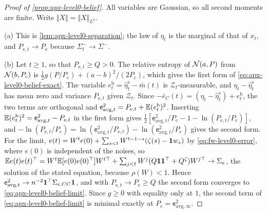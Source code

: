 \begin{proof}[Proof of \cref{prop:apx-level0-belief}]
All variables are Gaussian, so all second moments are finite. Write $\Vert X\Vert=\Vert X\Vert_{L^2}$.

(a) This is \cref{lem:apx-level0-separation}; the law of $\eta_t$ is the marginal of that of $x_t$, and $P_{\mathrm e,t}\to P_{\mathrm e}$ because $\Sigma^-_t\to\Sigma^-$.

(b) Let $t\ge1$, so that $P_{\mathrm e,t}\ge Q>0$. The relative entropy of $\mathcal{N}(a,P)$ from $\mathcal{N}(b,P_{\mathrm c})$ is $\frac12g(P/P_{\mathrm c})+(a-b)^2/(2P_{\mathrm c})$, which gives the first form of \eqref{eq:apx-level0-belief-exact}. The variable $e^{\mathrm b}_t=\hat\eta^{\mathrm e}_t-\bar m(t)$ is $\mathcal Z_t$-measurable, and $\eta_t-\hat\eta^{\mathrm e}_t$ has mean zero and variance $P_{\mathrm e,t}$ given $\mathcal Z_t$. Since $-\bar e_C(t)=(\eta_t-\hat\eta^{\mathrm e}_t)+e^{\mathrm b}_t$, the two terms are orthogonal and $\mathsf e_{\mathrm{avg},t}^2=P_{\mathrm e,t}+\mathbb{E}(e^{\mathrm b}_t)^2$. Inserting $\mathbb{E}(e^{\mathrm b}_t)^2=\mathsf e_{\mathrm{avg},t}^2-P_{\mathrm e,t}$ in the first form gives $\frac12[\mathsf e_{\mathrm{avg},t}^2/P_{\mathrm c}-1-\ln(P_{\mathrm e,t}/P_{\mathrm c})]$, and $-\ln(P_{\mathrm e,t}/P_{\mathrm c})=\ln(\mathsf e_{\mathrm{avg},t}^2/P_{\mathrm e,t})-\ln(\mathsf e_{\mathrm{avg},t}^2/P_{\mathrm c})$ gives the second form. For the limit, $e(t)=W^te(0)+\sum_{s<t}W^{t-1-s}(\zeta(s)-\mathbf{1} w_s)$ by \eqref{eq:fw-level0-error}, where $e(0)$ is independent of the noises, so $\mathbb{E} e(t)e(t)^\top=W^t\mathbb{E}[e(0)e(0)^\top]W^{t\top}+\sum_{j<t}W^j(Q\mathbf{1}\mathbf{1}^\top+Q^\zeta)W^{j\top}\to\Sigma_e$, the solution of the stated equation, because $\rho(W)<1$. Hence $\mathsf e_{\mathrm{avg},t}^2\to n^{-2}\mathbf{1}^\top\Sigma_{e,CC}\mathbf{1}$, and with $P_{\mathrm e,t}\to P_{\mathrm e}\ge Q$ the second form converges to \eqref{eq:apx-level0-belief-limit}. Since $g\ge0$ with equality only at $1$, the second term of \eqref{eq:apx-level0-belief-limit} is minimal exactly at $P_{\mathrm c}=\mathsf e_{\mathrm{avg},\infty}^2$.


\end{proof}
